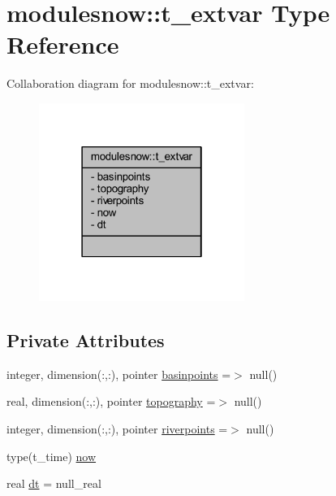 \hypertarget{structmodulesnow_1_1t__extvar}{}\section{modulesnow\+:\+:t\+\_\+extvar Type Reference}
\label{structmodulesnow_1_1t__extvar}


Collaboration diagram for modulesnow\+:\+:t\+\_\+extvar\+:\nopagebreak
\begin{figure}[H]
\begin{center}
\leavevmode
\includegraphics[width=190pt]{structmodulesnow_1_1t__extvar__coll__graph}
\end{center}
\end{figure}
\subsection*{Private Attributes}
\begin{DoxyCompactItemize}
\item 
integer, dimension(\+:,\+:), pointer \mbox{\hyperlink{structmodulesnow_1_1t__extvar_ad10611eddb048d7e6fa4289d0d982f38}{basinpoints}} =$>$ null()
\item 
real, dimension(\+:,\+:), pointer \mbox{\hyperlink{structmodulesnow_1_1t__extvar_a968613b8dcb515b20744ba65f7e0671e}{topography}} =$>$ null()
\item 
integer, dimension(\+:,\+:), pointer \mbox{\hyperlink{structmodulesnow_1_1t__extvar_a9c23e0e92e22417017f18520d368d8f2}{riverpoints}} =$>$ null()
\item 
type(t\+\_\+time) \mbox{\hyperlink{structmodulesnow_1_1t__extvar_a2b17ae9342f13d3717db806bc7e53fbf}{now}}
\item 
real \mbox{\hyperlink{structmodulesnow_1_1t__extvar_a8d858cde62322206f717bf682da5bb84}{dt}} = null\+\_\+real
\end{DoxyCompactItemize}


